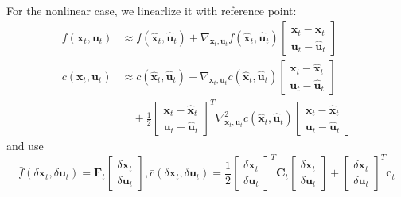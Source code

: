 \documentclass[10pt]{elegantbook}
\begin{document}
For the nonlinear case, we linearlize it with reference point:
\begin{align*}
f(\mathbf{x}_t, \mathbf{u}_t) &\approx f(\hat{\mathbf{x}}_t, \hat{\mathbf{u}}_t) + \nabla_{\mathbf{x}_t, \mathbf{u}_t} f(\hat{\mathbf{x}}_t, \hat{\mathbf{u}}_t)
\begin{bmatrix}
\mathbf{x}_t - \hat{\mathbf{x}}_t \\
\mathbf{u}_t - \hat{\mathbf{u}}_t
\end{bmatrix} \\
c(\mathbf{x}_t, \mathbf{u}_t) &\approx c(\hat{\mathbf{x}}_t, \hat{\mathbf{u}}_t) + \nabla_{\mathbf{x}_t, \mathbf{u}_t} c(\hat{\mathbf{x}}_t, \hat{\mathbf{u}}_t)
\begin{bmatrix}
\mathbf{x}_t - \hat{\mathbf{x}}_t \\
\mathbf{u}_t - \hat{\mathbf{u}}_t
\end{bmatrix} \\
&\quad + \frac{1}{2}
\begin{bmatrix}
\mathbf{x}_t - \hat{\mathbf{x}}_t \\
\mathbf{u}_t - \hat{\mathbf{u}}_t
\end{bmatrix}^T
\nabla^2_{\mathbf{x}_t, \mathbf{u}_t} c(\hat{\mathbf{x}}_t, \hat{\mathbf{u}}_t)
\begin{bmatrix}
\mathbf{x}_t - \hat{\mathbf{x}}_t \\
\mathbf{u}_t - \hat{\mathbf{u}}_t
\end{bmatrix}
\end{align*}
and use 
\[
\bar{f}(\delta\mathbf{x}_{t},\delta\mathbf{u}_{t})  =\mathbf{F}_{t}
\begin{bmatrix}
\delta\mathbf{x}_{t} \\
\delta\mathbf{u}_{t}
\end{bmatrix}, 
\left.\bar{c}(\delta\mathbf{x}_t,\delta\mathbf{u}_t)=\frac{1}{2}\left[
\begin{array}
{c}\delta\mathbf{x}_t \\
\delta\mathbf{u}_t
\end{array}\right.\right]^T\mathbf{C}_t
\begin{bmatrix}
\delta\mathbf{x}_t \\
\delta\mathbf{u}_t
\end{bmatrix}+
\begin{bmatrix}
\delta\mathbf{x}_t \\
\delta\mathbf{u}_t
\end{bmatrix}^T\mathbf{c}_t
\]
\end{document}

